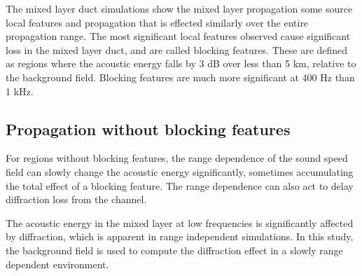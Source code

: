 \documentclass[preprint,NumberedRefs]{JASA}
\begin{document}
The mixed layer duct simulations show the mixed layer propagation some source  local features and propagation that is effected similarly over the entire propagation range. The most significant local features observed cause significant loss in the mixed layer duct, and are called blocking features. These are defined as regions where the acoustic energy falls by 3 dB over less than 5 km, relative to the background field. Blocking features are much more significant at 400 Hz than 1 kHz.

\subsection{Propagation without blocking features}
For regions without blocking features, the range dependence of the sound speed field can slowly change the acoustic energy significantly, sometimes accumulating the total effect of a blocking feature. The range dependence can also act to delay diffraction loss from the channel.

The acoustic energy in the mixed layer at low frequencies is significantly affected by diffraction, which is apparent in range independent simulations. In this study, the background field is used to compute the diffraction effect in a slowly range dependent environment.



\end{document}

